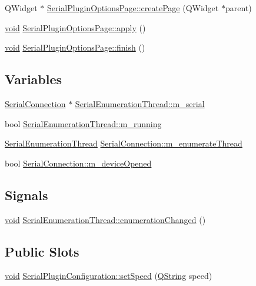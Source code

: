 \begin{DoxyCompactItemize}
\item 
\-Q\-Widget $\ast$ \hyperlink{group___serial_plugin_ga77331da48998f8e92c60751f5e2ab862}{\-Serial\-Plugin\-Options\-Page\-::create\-Page} (\-Q\-Widget $\ast$parent)
\item 
\hyperlink{group___u_a_v_objects_plugin_ga444cf2ff3f0ecbe028adce838d373f5c}{void} \hyperlink{group___serial_plugin_ga442981f9537c634cbc6bd160f30c0a8a}{\-Serial\-Plugin\-Options\-Page\-::apply} ()
\item 
\hyperlink{group___u_a_v_objects_plugin_ga444cf2ff3f0ecbe028adce838d373f5c}{void} \hyperlink{group___serial_plugin_ga7d5463f2125597e0962512fde1cd83e4}{\-Serial\-Plugin\-Options\-Page\-::finish} ()
\end{DoxyCompactItemize}
\subsection*{\-Variables}
\begin{DoxyCompactItemize}
\item 
\hyperlink{class_serial_connection}{\-Serial\-Connection} $\ast$ \hyperlink{group___serial_plugin_ga5f88185588c5c33293dad0342be60237}{\-Serial\-Enumeration\-Thread\-::m\-\_\-serial}
\item 
bool \hyperlink{group___serial_plugin_ga1b3398189b91a1994544370f00f8cd00}{\-Serial\-Enumeration\-Thread\-::m\-\_\-running}
\item 
\hyperlink{class_serial_enumeration_thread}{\-Serial\-Enumeration\-Thread} \hyperlink{group___serial_plugin_ga5895d83033636cc3832bd9478f4415f7}{\-Serial\-Connection\-::m\-\_\-enumerate\-Thread}
\item 
bool \hyperlink{group___serial_plugin_gac430f3139892f313e094560f5e2e72d1}{\-Serial\-Connection\-::m\-\_\-device\-Opened}
\end{DoxyCompactItemize}
\subsection*{\-Signals}
\begin{DoxyCompactItemize}
\item 
\hyperlink{group___u_a_v_objects_plugin_ga444cf2ff3f0ecbe028adce838d373f5c}{void} \hyperlink{group___serial_plugin_ga18ace5d92ca2899dc35a0fa3b43e016a}{\-Serial\-Enumeration\-Thread\-::enumeration\-Changed} ()
\end{DoxyCompactItemize}
\subsection*{\-Public \-Slots}
\begin{DoxyCompactItemize}
\item 
\hyperlink{group___u_a_v_objects_plugin_ga444cf2ff3f0ecbe028adce838d373f5c}{void} \hyperlink{group___serial_plugin_ga6e476e94e24bb1f9bf91de3c99ff00fc}{\-Serial\-Plugin\-Configuration\-::set\-Speed} (\hyperlink{group___u_a_v_objects_plugin_gab9d252f49c333c94a72f97ce3105a32d}{\-Q\-String} speed)
\end{DoxyCompactItemize}
